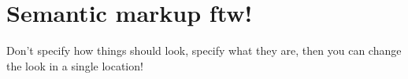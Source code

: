 \chapter{Semantic markup ftw!}

Don't specify how things should look, specify what they are, then you can change the look in a single location!


